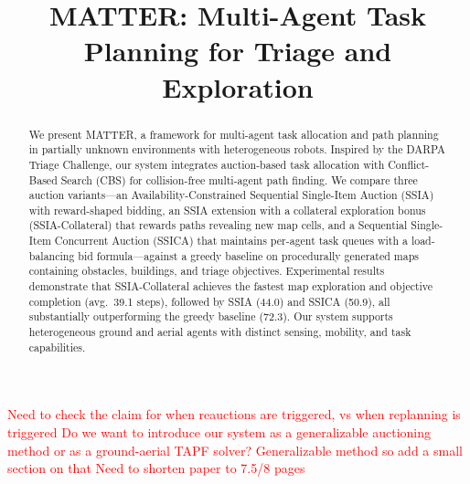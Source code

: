 \documentclass[conference]{IEEEtran}
\begin{document}
\title{MATTER: Multi-Agent Task Planning for Triage and Exploration}

\author{
\and
{}
\and
{}
}

\maketitle

\textcolor{red}{Need to check the claim for when reauctions are triggered, vs when replanning is triggered}
\textcolor{red}{Do we want to introduce our system as a generalizable auctioning method or as a ground-aerial TAPF solver? Generalizable method so add a small section on that}
\textcolor{red}{}
\textcolor{red}{Need to shorten paper to 7.5/8 pages}

\begin{abstract}
We present MATTER, a framework for multi-agent task allocation and path planning in partially unknown environments with heterogeneous robots. Inspired by the DARPA Triage Challenge, our system integrates auction-based task allocation with Conflict-Based Search (CBS) for collision-free multi-agent path finding. We compare three auction variants---an Availability-Constrained Sequential Single-Item Auction (SSIA) with reward-shaped bidding, an SSIA extension with a collateral exploration bonus (SSIA-Collateral) that rewards paths revealing new map cells, and a Sequential Single-Item Concurrent Auction (SSICA) that maintains per-agent task queues with a load-balancing bid formula---against a greedy baseline on procedurally generated maps containing obstacles, buildings, and triage objectives. Experimental results demonstrate that SSIA-Collateral achieves the fastest map exploration and objective completion (avg.~39.1 steps), followed by SSIA (44.0) and SSICA (50.9), all substantially outperforming the greedy baseline (72.3). Our system supports heterogeneous ground and aerial agents with distinct sensing, mobility, and task capabilities.
\end{abstract}
\end{document}
